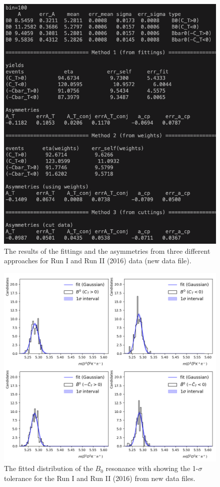 \begin{figure}[h]
\center
\includegraphics*[width=0.76\linewidth]{LHCb_Run1_AND_2/B0_yields_asy_new}
\caption{The results of the fittings and the asymmetries from three different approaches for Run I and Run II (2016) data (new data file).}
\label{B0_yields_asy_new_run12}
\end{figure}
\begin{figure}[h]
\center
\includegraphics*[width=0.76\linewidth]{LHCb_Run1_AND_2/invmass_B0_fit_tp}
\caption{The fitted distribution of the $B_0$ resonance with showing the 1-$\sigma$ tolerance for the Run I and Run II  (2016) from new data files.}
\label{fit_B0_run12}
\end{figure}
